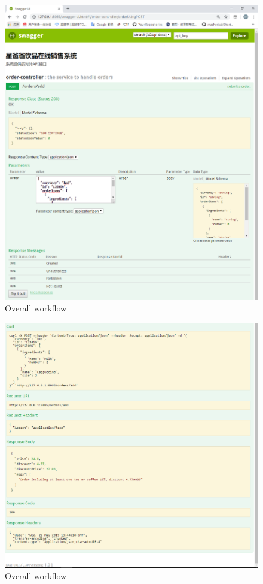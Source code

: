 \documentclass[a4paper]{report}
\begin{document}
\begin{figure}
  \centering
  \includegraphics[scale=0.45]{swagger2.png}
  \caption{Overall workflow}\label{2}
\end{figure}

\begin{figure}
  \centering
  \includegraphics[scale=0.45]{swagger1.png}
  \caption{Overall workflow}\label{3}
\end{figure}
\end{document}
